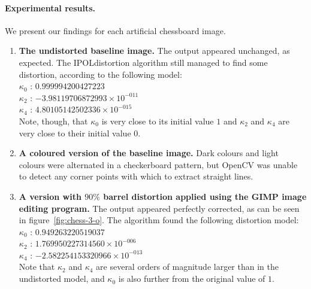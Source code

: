 \paragraph{Experimental results.}
We present our findings for each artificial chessboard image.
\begin{enumerate}
  \item \textbf{The undistorted baseline image.} The output appeared unchanged, as expected. The IPOLdistortion algorithm still managed to find some distortion, according to the following model:\\
   $ \kappa_{0}$ : $0.999994200427223$\\
   $ \kappa_{2}$ : $-3.98119706872993 \times 10^{-011}$\\
   $ \kappa_{4}$ : $4.80105142502336 \times 10^{-015}$\\
   Note, though, that $\kappa_{0}$ is very close to its initial value $1$ and $\kappa_{2}$ and $\kappa_{4}$ are very close to their initial value $0$.
  \item \textbf{A coloured version of the baseline image.} Dark colours and light colours were alternated in a checkerboard pattern, but OpenCV was unable to detect any corner points with which to extract straight lines.
  \item \textbf{A version with $90\%$ barrel distortion applied using the GIMP image editing program.} The output appeared perfectly corrected, as can be seen in figure~\ref{fig:chess-3-o}. The algorithm found the following distortion model:\\
   $ \kappa_{0}$ : $0.949263220519037$\\
   $ \kappa_{2}$ : $1.769950227314560 \times 10^{-006}$\\
   $ \kappa_{4}$ : $-2.582254153320966 \times 10^{-013}$\\
   Note that $\kappa_{2}$ and $\kappa_{4}$ are several orders of magnitude larger than in the undistorted model, and $\kappa_{0}$ is also further from the original value of $1$.
\begin{figure}[h]
  \centering

\end{figure}
\end{enumerate}
